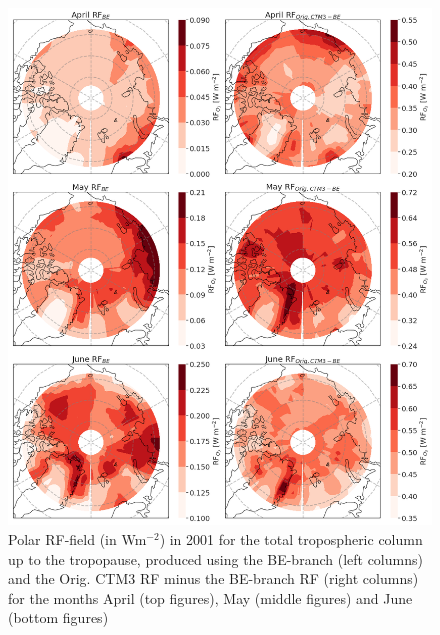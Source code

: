 \begin{figure}[ht]
    \centering
    \includegraphics[width = \linewidth]{Chapter6_Results/images/RF/RF_USE/BEOrig_RF_polar_AprJune_2001.png}
    \caption{Polar RF-field (in Wm$^{-2}$) in 2001 for the total tropospheric column up to the tropopause, produced using the BE-branch (left columns) and the Orig. CTM3 RF minus the BE-branch RF (right columns) for the months April (top figures), May (middle figures) and June (bottom figures)}
    \label{fig:BEorig_RF_polar_AprJune_2001}
\end{figure}